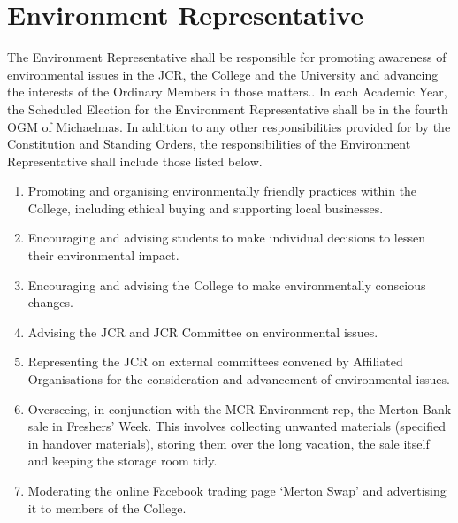 \section{Environment Representative}
\npara The Environment Representative shall be responsible for promoting awareness of environmental issues in the JCR, the College and the University and advancing the interests of the Ordinary Members in those matters.. 
\npara In each Academic Year, the Scheduled Election for the Environment Representative shall be in the fourth OGM of Michaelmas.
\npara In addition to any other responsibilities provided for by the Constitution and Standing Orders, the responsibilities of the Environment Representative shall include those listed below.
\begin{enumerate}
	\item Promoting and organising environmentally friendly practices within the College, including ethical buying and supporting local businesses.
	\item Encouraging and advising students to make individual decisions to lessen their environmental impact.
	\item Encouraging and advising the College to make environmentally conscious changes.
	\item Advising the JCR and JCR Committee on environmental issues.
	\item Representing the JCR on external committees convened by Affiliated Organisations for the consideration and advancement of environmental issues.
	\item Overseeing, in conjunction with the MCR Environment rep, the Merton Bank sale in Freshers' Week. This involves collecting unwanted materials (specified in handover materials), storing them over the long vacation, the sale itself and keeping the storage room tidy.
	\item Moderating the online Facebook trading page `Merton Swap' and advertising it to members of the College.
\end{enumerate}
